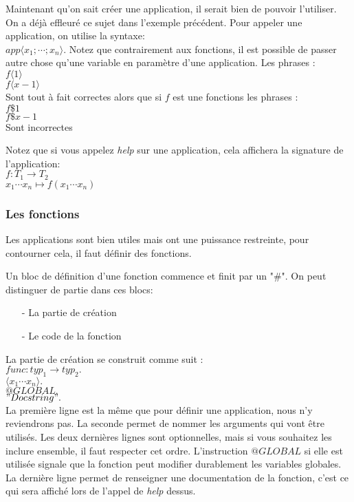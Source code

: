 \documentclass{article}
\begin{document}
Maintenant qu'on sait créer une application, il serait bien de pouvoir l'utiliser. On a déjà effleuré ce sujet dans l'exemple précédent. Pour appeler une application, on utilise la syntaxe:\\
$app\langle x_1;\dotsb;x_n\rangle$. Notez que contrairement aux fonctions, il est possible de passer autre chose qu'une variable en paramètre d'une application. Les phrases :\\
$f\langle1\rangle$\\
$f\langle x-1\rangle$\\
Sont tout à fait correctes alors que si $f$ est une fonctions les phrases :\\
$f\$1$\\
$f\$ x-1$\\
Sont incorrectes

Notez que si vous appelez \textit{help} sur une application, cela affichera la signature de l'application: \\
$f : T_1 \longrightarrow T_2$\\
$    x_1 \cdots x_n \longmapsto f(x_1\cdots x_n)$

\subsubsection{Les fonctions}

Les applications sont bien utiles mais ont une puissance restreinte, pour contourner cela, il faut définir des fonctions.

Un bloc de définition d'une fonction commence et finit par un "\#". On peut distinguer de partie dans ces blocs:
\begin{enumerate}
    \item[-] La partie de création
    \item[-] Le code de la fonction
\end{enumerate}

La partie de création se construit comme suit :\\
$func : typ_1 \longrightarrow typ_2.$\\
$\langle x_1\cdots x_n\rangle.$\\
$@GLOBAL.$\\
$"Doc string".$\\

La première ligne est la même que pour définir une application, nous n'y reviendrons pas. La seconde permet de nommer les arguments qui vont être utilisés. Les deux dernières lignes sont optionnelles, mais si vous souhaitez les inclure ensemble, il faut respecter cet ordre. L'instruction $@GLOBAL$ si elle est utilisée signale que la fonction peut modifier durablement les variables globales. La dernière ligne permet de renseigner une documentation de la fonction, c'est ce qui sera affiché lors de l'appel de \textit{help} dessus.
\end{document}
